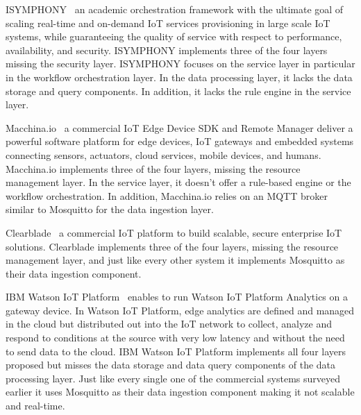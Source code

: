 ISYMPHONY~\cite{8039055} an academic orchestration framework with the ultimate goal of scaling real-time and on-demand IoT services provisioning in large scale IoT systems, while guaranteeing the quality of service with respect to performance, availability, and security. ISYMPHONY implements three of the four layers missing the security layer. ISYMPHONY focuses on the service layer in particular in the workflow orchestration layer. In the data processing layer, it lacks the data storage and query components. In addition, it lacks the rule engine in the service layer.

Macchina.io~\cite{Macchina.io} a commercial IoT Edge Device SDK and Remote Manager deliver a powerful software platform for edge devices, IoT gateways and embedded systems connecting sensors, actuators, cloud services, mobile devices, and humans. Macchina.io implements three of the four layers, missing the resource management layer. In the service layer, it doesn't offer a rule-based engine or the workflow orchestration. In addition, Macchina.io relies on an MQTT broker similar to Mosquitto for the data ingestion layer.

Clearblade~\cite{Clearblade} a commercial  IoT platform to build scalable, secure enterprise IoT solutions. Clearblade implements three of the four layers, missing the resource management layer, and just like every other system it implements Mosquitto as their data ingestion component.

IBM Watson IoT Platform~\cite{IBM} enables to run Watson IoT Platform Analytics on a gateway device. In Watson IoT Platform, edge analytics are defined and managed in the cloud but distributed out into the IoT network to collect, analyze and respond to conditions at the source with very low latency and without the need to send data to the cloud. IBM Watson IoT Platform implements all four layers proposed but misses the data storage and data query components of the data processing layer. Just like every single one of the commercial systems surveyed earlier it uses Mosquitto as their data ingestion component making it not scalable and real-time.

